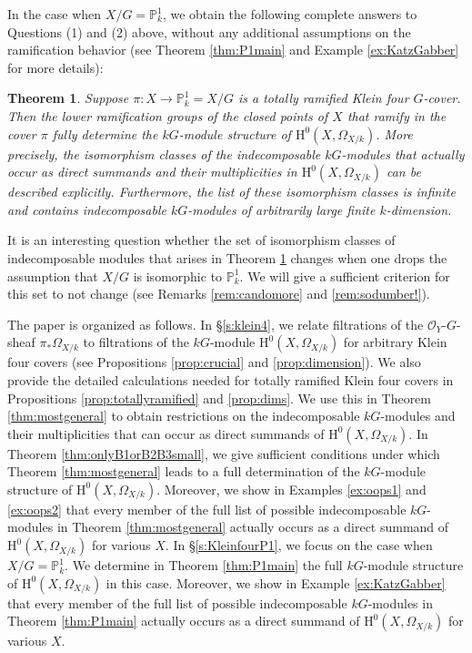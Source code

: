 \documentclass{amsart}
\numberwithin{equation}{section}
\numberwithin{table}{section}
\theoremstyle{plain}
\newtheorem{theorem}{Theorem}[section]
\theoremstyle{definition}
\theoremstyle{remark}
\newcommand{\HH}{\mathrm{H}}
\begin{document}
In the case when $X/G=\mathbb{P}^1_k$, we obtain the following complete answers to Questions (1) and (2) above, without any additional assumptions on the ramification behavior (see Theorem \ref{thm:P1main} and Example \ref{ex:KatzGabber} for more details):

\begin{theorem}
\label{thm:awkward2}
Suppose $\pi:X\to \mathbb{P}^1_k=X/G$ is a totally ramified Klein four $G$-cover. Then the lower ramification groups of the closed points of $X$ that ramify in the cover $\pi$ fully determine the $kG$-module structure of $\HH^0(X,\Omega_{X/k})$. More precisely, the isomorphism classes of the indecomposable $kG$-modules that actually occur as direct summands and their multiplicities in $\HH^0(X,\Omega_{X/k})$ can be described explicitly. Furthermore, the list of these isomorphism classes is infinite and contains indecomposable $kG$-modules of arbitrarily large finite $k$-dimension.
\end{theorem}

It is an interesting question whether the set of isomorphism classes of indecomposable modules that arises in Theorem \ref{thm:awkward2} changes when one drops the assumption that $X/G$ is isomorphic to $\mathbb{P}^1_k$. We will give a sufficient criterion for this set to not change (see Remarks \ref{rem:candomore} and \ref{rem:sodumber!}).


\medskip

The paper is organized as follows. In \S\ref{s:klein4}, we relate filtrations of the $\mathcal{O}_Y$-$G$-sheaf $\pi_*\Omega_{X/k}$ to filtrations of the $kG$-module $\HH^0(X,\Omega_{X/k})$ for arbitrary Klein four covers (see Propositions \ref{prop:crucial} and \ref{prop:dimension}). We also provide the detailed calculations needed for totally ramified Klein four covers in Propositions \ref{prop:totallyramified} and \ref{prop:dims}. We  use this in Theorem \ref{thm:mostgeneral} to obtain restrictions on the indecomposable $kG$-modules and their multiplicities that can occur as direct summands of $\HH^0(X,\Omega_{X/k})$. In Theorem \ref{thm:onlyB1orB2B3small}, we give sufficient conditions under which Theorem \ref{thm:mostgeneral} leads to a full determination of the $kG$-module structure of $\HH^0(X,\Omega_{X/k})$. Moreover, we show in Examples \ref{ex:oops1} and \ref{ex:oops2} that every member of the full list of possible indecomposable $kG$-modules in Theorem \ref{thm:mostgeneral} actually occurs as a direct summand of $\HH^0(X,\Omega_{X/k})$ for various $X$. 
In \S\ref{s:KleinfourP1}, we focus on the case when $X/G=\mathbb{P}^1_k$. We determine in Theorem \ref{thm:P1main} the full $kG$-module structure of $\HH^0(X,\Omega_{X/k})$ in this case. Moreover, we show in Example \ref{ex:KatzGabber} that every member of the full list of possible indecomposable $kG$-modules in Theorem \ref{thm:P1main} actually occurs as a direct summand of $\HH^0(X,\Omega_{X/k})$ for various $X$. 
\end{document}
